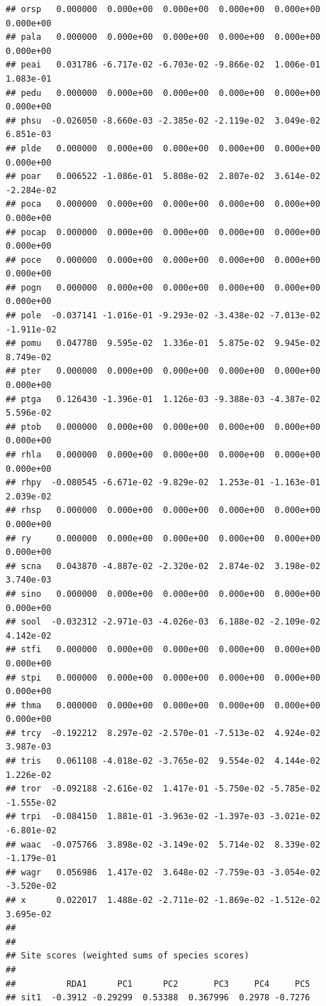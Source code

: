 \documentclass[
]{article}
\begin{document}
\begin{verbatim}
## orsp   0.000000  0.000e+00  0.000e+00  0.000e+00  0.000e+00  0.000e+00
## pala   0.000000  0.000e+00  0.000e+00  0.000e+00  0.000e+00  0.000e+00
## peai   0.031786 -6.717e-02 -6.703e-02 -9.866e-02  1.006e-01  1.083e-01
## pedu   0.000000  0.000e+00  0.000e+00  0.000e+00  0.000e+00  0.000e+00
## phsu  -0.026050 -8.660e-03 -2.385e-02 -2.119e-02  3.049e-02  6.851e-03
## plde   0.000000  0.000e+00  0.000e+00  0.000e+00  0.000e+00  0.000e+00
## poar   0.006522 -1.086e-01  5.808e-02  2.807e-02  3.614e-02 -2.284e-02
## poca   0.000000  0.000e+00  0.000e+00  0.000e+00  0.000e+00  0.000e+00
## pocap  0.000000  0.000e+00  0.000e+00  0.000e+00  0.000e+00  0.000e+00
## poce   0.000000  0.000e+00  0.000e+00  0.000e+00  0.000e+00  0.000e+00
## pogn   0.000000  0.000e+00  0.000e+00  0.000e+00  0.000e+00  0.000e+00
## pole  -0.037141 -1.016e-01 -9.293e-02 -3.438e-02 -7.013e-02 -1.911e-02
## pomu   0.047780  9.595e-02  1.336e-01  5.875e-02  9.945e-02  8.749e-02
## pter   0.000000  0.000e+00  0.000e+00  0.000e+00  0.000e+00  0.000e+00
## ptga   0.126430 -1.396e-01  1.126e-03 -9.388e-03 -4.387e-02  5.596e-02
## ptob   0.000000  0.000e+00  0.000e+00  0.000e+00  0.000e+00  0.000e+00
## rhla   0.000000  0.000e+00  0.000e+00  0.000e+00  0.000e+00  0.000e+00
## rhpy  -0.080545 -6.671e-02 -9.829e-02  1.253e-01 -1.163e-01  2.039e-02
## rhsp   0.000000  0.000e+00  0.000e+00  0.000e+00  0.000e+00  0.000e+00
## ry     0.000000  0.000e+00  0.000e+00  0.000e+00  0.000e+00  0.000e+00
## scna   0.043870 -4.887e-02 -2.320e-02  2.874e-02  3.198e-02  3.740e-03
## sino   0.000000  0.000e+00  0.000e+00  0.000e+00  0.000e+00  0.000e+00
## sool  -0.032312 -2.971e-03 -4.026e-03  6.188e-02 -2.109e-02  4.142e-02
## stfi   0.000000  0.000e+00  0.000e+00  0.000e+00  0.000e+00  0.000e+00
## stpi   0.000000  0.000e+00  0.000e+00  0.000e+00  0.000e+00  0.000e+00
## thma   0.000000  0.000e+00  0.000e+00  0.000e+00  0.000e+00  0.000e+00
## trcy  -0.192212  8.297e-02 -2.570e-01 -7.513e-02  4.924e-02  3.987e-03
## tris   0.061108 -4.018e-02 -3.765e-02  9.554e-02  4.144e-02  1.226e-02
## tror  -0.092188 -2.616e-02  1.417e-01 -5.750e-02 -5.785e-02 -1.555e-02
## trpi  -0.084150  1.881e-01 -3.963e-02 -1.397e-03 -3.021e-02 -6.801e-02
## waac  -0.075766  3.898e-02 -3.149e-02  5.714e-02  8.339e-02 -1.179e-01
## wagr   0.056986  1.417e-02  3.648e-02 -7.759e-03 -3.054e-02 -3.520e-02
## x      0.022017  1.488e-02 -2.711e-02 -1.869e-02 -1.512e-02  3.695e-02
## 
## 
## Site scores (weighted sums of species scores)
## 
##          RDA1      PC1      PC2       PC3     PC4     PC5
## sit1  -0.3912 -0.29299  0.53388  0.367996  0.2978 -0.7276

\end{verbatim}
\end{document}

